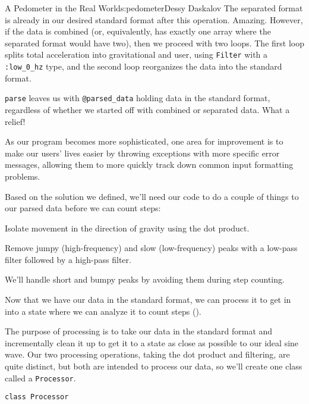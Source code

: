\begin{aosachapter}{A Pedometer in the Real World}{s:pedometer}{Dessy Daskalov}
The separated format is already in our desired standard format after
this operation. Amazing. However, if the data is combined (or,
equivalently, has exactly one array where the separated format would
have two), then we proceed with two loops. The first loop splits total
acceleration into gravitational and user, using \texttt{Filter} with a
\texttt{:low\_0\_hz} type, and the second loop reorganizes the data into
the standard format.

\texttt{parse} leaves us with \texttt{@parsed\_data} holding data in the
standard format, regardless of whether we started off with combined or
separated data. What a relief!

As our program becomes more sophisticated, one area for improvement is
to make our users' lives easier by throwing exceptions with more
specific error messages, allowing them to more quickly track down common
input formatting problems.

\label{processing}

Based on the solution we defined, we'll need our code to do a couple of
things to our parsed data before we can count steps:

\begin{aosaenumerate}
\def\labelenumi{\arabic{enumi}.}

\item
  Isolate movement in the direction of gravity using the dot product.
\item
  Remove jumpy (high-frequency) and slow (low-frequency) peaks with a
  low-pass filter followed by a high-pass filter.
\end{aosaenumerate}

We'll handle short and bumpy peaks by avoiding them during step
counting.

Now that we have our data in the standard format, we can process it to
get in into a state where we can analyze it to count steps
().


The purpose of processing is to take our data in the standard format and
incrementally clean it up to get it to a state as close as possible to
our ideal sine wave. Our two processing operations, taking the dot
product and filtering, are quite distinct, but both are intended to
process our data, so we'll create one class called a \texttt{Processor}.

\begin{verbatim}
class Processor


\end{verbatim}
\end{aosachapter}
